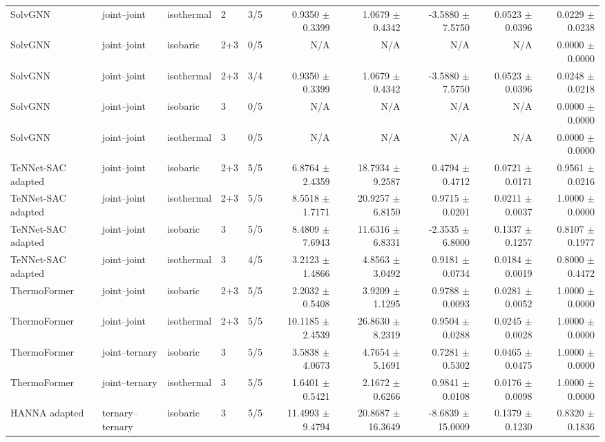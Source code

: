 \begin{tabular}{lllllrrrrr}
SolvGNN & joint--joint & isothermal & 2 & 3/5 & 0.9350 $\pm$ 0.3399 & 1.0679 $\pm$ 0.4342 & -3.5880 $\pm$ 7.5750 & 0.0523 $\pm$ 0.0396 & 0.0229 $\pm$ 0.0238 \\
SolvGNN & joint--joint & isobaric & 2+3 & 0/5 & N/A & N/A & N/A & N/A & 0.0000 $\pm$ 0.0000 \\
SolvGNN & joint--joint & isothermal & 2+3 & 3/4 & 0.9350 $\pm$ 0.3399 & 1.0679 $\pm$ 0.4342 & -3.5880 $\pm$ 7.5750 & 0.0523 $\pm$ 0.0396 & 0.0248 $\pm$ 0.0218 \\
SolvGNN & joint--joint & isobaric & 3 & 0/5 & N/A & N/A & N/A & N/A & 0.0000 $\pm$ 0.0000 \\
SolvGNN & joint--joint & isothermal & 3 & 0/5 & N/A & N/A & N/A & N/A & 0.0000 $\pm$ 0.0000 \\
TeNNet-SAC adapted & joint--joint & isobaric & 2+3 & 5/5 & 6.8764 $\pm$ 2.4359 & 18.7934 $\pm$ 9.2587 & 0.4794 $\pm$ 0.4712 & 0.0721 $\pm$ 0.0171 & 0.9561 $\pm$ 0.0216 \\
TeNNet-SAC adapted & joint--joint & isothermal & 2+3 & 5/5 & 8.5518 $\pm$ 1.7171 & 20.9257 $\pm$ 6.8150 & 0.9715 $\pm$ 0.0201 & 0.0211 $\pm$ 0.0037 & 1.0000 $\pm$ 0.0000 \\
TeNNet-SAC adapted & joint--joint & isobaric & 3 & 5/5 & 8.4809 $\pm$ 7.6943 & 11.6316 $\pm$ 6.8331 & -2.3535 $\pm$ 6.8000 & 0.1337 $\pm$ 0.1257 & 0.8107 $\pm$ 0.1977 \\
TeNNet-SAC adapted & joint--joint & isothermal & 3 & 4/5 & 3.2123 $\pm$ 1.4866 & 4.8563 $\pm$ 3.0492 & 0.9181 $\pm$ 0.0734 & 0.0184 $\pm$ 0.0019 & 0.8000 $\pm$ 0.4472 \\
ThermoFormer & joint--joint & isobaric & 2+3 & 5/5 & 2.2032 $\pm$ 0.5408 & 3.9209 $\pm$ 1.1295 & 0.9788 $\pm$ 0.0093 & 0.0281 $\pm$ 0.0052 & 1.0000 $\pm$ 0.0000 \\
ThermoFormer & joint--joint & isothermal & 2+3 & 5/5 & 10.1185 $\pm$ 2.4539 & 26.8630 $\pm$ 8.2319 & 0.9504 $\pm$ 0.0288 & 0.0245 $\pm$ 0.0028 & 1.0000 $\pm$ 0.0000 \\
ThermoFormer & joint--ternary & isobaric & 3 & 5/5 & 3.5838 $\pm$ 4.0673 & 4.7654 $\pm$ 5.1691 & 0.7281 $\pm$ 0.5302 & 0.0465 $\pm$ 0.0475 & 1.0000 $\pm$ 0.0000 \\
ThermoFormer & joint--ternary & isothermal & 3 & 5/5 & 1.6401 $\pm$ 0.5421 & 2.1672 $\pm$ 0.6266 & 0.9841 $\pm$ 0.0108 & 0.0176 $\pm$ 0.0098 & 1.0000 $\pm$ 0.0000 \\
HANNA adapted & ternary--ternary & isobaric & 3 & 5/5 & 11.4993 $\pm$ 9.4794 & 20.8687 $\pm$ 16.3649 & -8.6839 $\pm$ 15.0009 & 0.1379 $\pm$ 0.1230 & 0.8320 $\pm$ 0.1836 \\

\end{tabular}
